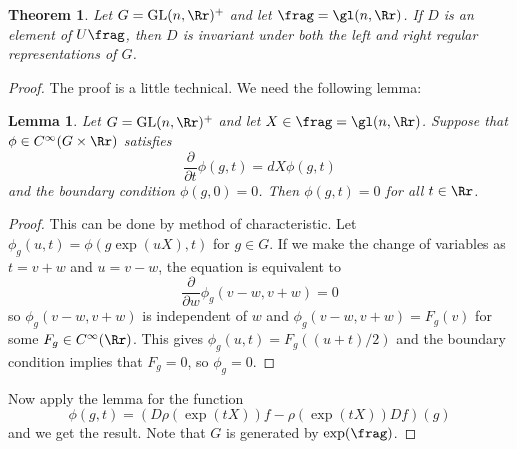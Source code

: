 \documentclass{article}
\newtheorem{theorem}{Theorem}[section]
\newtheorem{lemma}{Lemma}[section]
\newcommand{\GL}{\mathrm{GL}}
\begin{document}
\begin{theorem}
\label{center}
Let $G = \GL(n, \Rr)^{+}$ and let $\frag = \gl(n, \Rr)$. If $D$ is an element of $U\frag$, then $D$ is invariant under both the left and right regular representations of $G$. 
\end{theorem}
\begin{proof}
The proof is a little technical. We need the following lemma:
\begin{lemma}
Let $G = \GL(n, \Rr)^{+}$ and let $X\in \frag = \gl(n, \Rr)$. Suppose that $\phi\in C^{\infty}(G\times \Rr)$ satisfies 
$$
\frac{\partial}{\partial t} \phi(g, t) = dX \phi(g, t)
$$
and the boundary condition $\phi(g, 0) = 0$. Then $\phi(g, t) = 0$ for all $t\in \Rr$. 
\end{lemma}
\begin{proof}
This can be done by method of characteristic. Let $\phi_{g}(u, t) = \phi(g \exp(uX),t)$ for $g\in G$. If we make the change of variables as $t = v + w$ and $u = v-w$, the equation is equivalent to 
$$
\frac{\partial}{\partial w}\phi_{g}(v-w, v+w) = 0
$$
so $\phi_{g}(v-w, v+w)$ is independent of $w$ and $\phi_{g}(v-w, v+w) = F_{g}(v)$ for some $F_{g}\in C^{\infty}(\Rr)$. This gives $\phi_{g}(u, t) = F_{g}((u+t)/2)$ and the boundary condition implies that $F_{g} = 0$, so $\phi_{g} = 0$. 
\end{proof}
Now apply the lemma for the function
$$
\phi(g, t) = (D\rho(\exp(tX))f - \rho(\exp(tX))Df)(g)
$$
and we get the result. Note that $G$ is generated by $\exp(\frag)$.
\end{proof}
\end{document}
